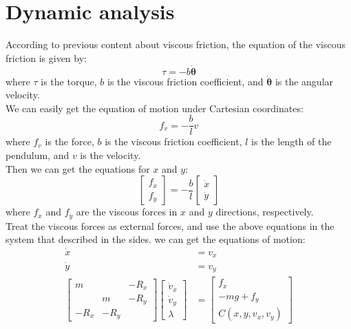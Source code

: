 \documentclass{article}
\begin{document}
\section*{Dynamic analysis}
According to previous content about viscous friction, the equation of the viscous friction is given by:
\begin{equation}
    \tau = -b\mathbf{\dot{\theta}}
\end{equation}
where $\tau$ is the torque, $b$ is the viscous friction coefficient, and $\mathbf{\dot{\theta}}$ is the angular velocity.\\
We can easily get the equation of motion under Cartesian coordinates:
\begin{equation}
    f_v = -\frac{b}{l} v
\end{equation}
where $f_v$ is the force, $b$ is the viscous friction coefficient, $l$ is the length of the pendulum, and $v$ is the velocity.\\
Then we can get the equations for $x$ and $y$:
\begin{equation}
    \left[\begin{array}{c}
    f_x \\
    f_y
    \end{array}\right] = -\frac{b}{l} \left[\begin{array}{c}
    \dot{x} \\
    \dot{y}
    \end{array}\right]
  \end{equation}
where $f_x$ and $f_y$ are the viscous forces in $x$ and $y$ directions, respectively.\\
Treat the viscous forces as external forces, and use the above equations in the system that described in the sides.
we can get the equations of motion:
\begin{equation}
  \label{eq:dynamic}
  \begin{aligned}
  \dot{x} & =v_x \\
  \dot{y} & =v_y \\
  {\left[\begin{array}{ccc}
  m & & -R_x \\
  & m & -R_y \\
  -R_x & -R_y
  \end{array}\right]\left[\begin{array}{c}
  \dot{v}_x \\
  \dot{v}_y \\
  \lambda
  \end{array}\right] } & =\left[\begin{array}{c}
  f_x \\
  -m g+f_y \\
  C\left(x, y, v_x, v_y\right)
  \end{array}\right]
  \end{aligned}
\end{equation}
\end{document}
